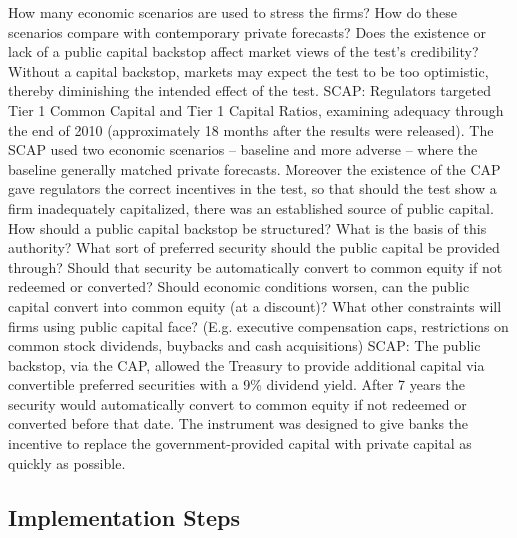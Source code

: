 \documentclass[12pt]{article}
\begin{document}
\begin{outline}[enumerate]
\3 How many economic scenarios are used to stress the firms?
\3 How do these scenarios compare with contemporary private forecasts?
\2 Does the existence or lack of a public capital backstop affect market views of the test's credibility? Without a capital backstop, markets may expect the test to be too optimistic, thereby diminishing the intended effect of the test.
\2 SCAP: Regulators targeted Tier 1 Common Capital and Tier 1 Capital Ratios, examining adequacy through the end of 2010 (approximately 18 months after the results were released). The SCAP used two economic scenarios -- baseline and more adverse -- where the baseline generally matched private forecasts. Moreover the existence of the CAP gave regulators the correct incentives in the test, so that should the test show a firm inadequately capitalized, there was an established source of public capital.
\1 How should a public capital backstop be structured?
\2 What is the basis of this authority?
\2 What sort of preferred security should the public capital be provided through? Should that security be automatically convert to common equity if not redeemed or converted?
\2 Should economic conditions worsen, can the public capital convert into common equity (at a discount)?
\2 What other constraints will firms using public capital face? (E.g. executive compensation caps, restrictions on common stock dividends, buybacks and cash acquisitions)
\2 SCAP: The public backstop, via the CAP, allowed the Treasury to provide additional capital via convertible preferred securities with a 9\% dividend yield. After 7 years the security would automatically convert to common equity if not redeemed or converted before that date. The instrument was designed to give banks the incentive to replace the government-provided capital with private capital as quickly as possible.

\end{outline}

\subsection{Implementation Steps}
\end{document}
